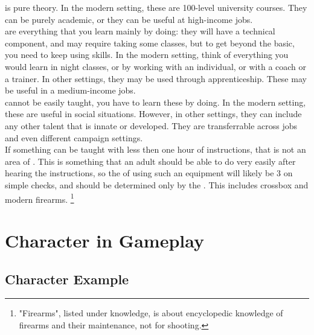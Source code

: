 \documentclass{LegrandOrangeTufteBook}
\begin{document}


 is pure theory. In the modern setting, these are 100-level university courses. They can be purely academic, or they can be useful at high-income jobs.\\
 are everything that you learn mainly by doing:
they will have a technical component, and may require taking some classes, but to get beyond the basic, you need to keep using skills.
In the modern setting, think of everything you would learn in night classes, or by working with an individual, or with a coach or a trainer.
In other settings, they may be used through apprenticeship.
These may be useful in a medium-income jobs.\\
 cannot be easily taught, you have to learn these by doing.
In the modern setting, these are useful in social situations.
However, in other settings, they can include any other talent that is innate or developed.
They are transferrable across jobs and even different campaign settings.\\

If something can be taught with less then one hour of instructions, that is not an area of .
This is something that an adult should be able to do very easily after hearing the instructions,
so the  of using such an equipment will likely be 3 on simple checks,
and should be determined only by the .
This includes crossbox and modern firearms.
\footnote{"Firearms", listed under knowledge, is about encyclopedic knowledge of firearms and their maintenance, not for shooting.}





\section*{Character in Gameplay}

\subsection*{Character Example}
\end{document}
